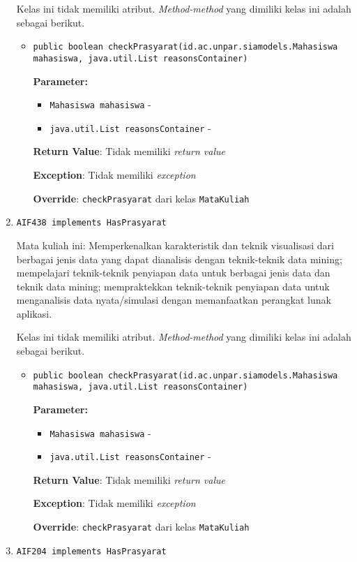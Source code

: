 \documentclass{article}
\begin{document}
\begin{enumerate}
Kelas ini tidak memiliki atribut. \textit{Method-method} yang dimiliki kelas ini adalah sebagai berikut.
\begin{itemize}
\item \texttt{public boolean checkPrasyarat(id.ac.unpar.siamodels.Mahasiswa mahasiswa, java.util.List reasonsContainer)}

\textbf{Parameter:}
\begin{itemize}
\item \texttt{Mahasiswa mahasiswa} - 
\item \texttt{java.util.List reasonsContainer} - 
\end{itemize}
\textbf{Return Value}: Tidak memiliki \textit{return value}

\textbf{Exception}: Tidak memiliki \textit{exception}

\textbf{Override}: \texttt{checkPrasyarat} dari kelas \texttt{MataKuliah}

\end{itemize}
\item \texttt{AIF438 implements HasPrasyarat}

Mata kuliah ini: Memperkenalkan karakteristik dan teknik visualisasi dari
 berbagai jenis data yang dapat dianalisis dengan teknik-teknik data mining;
 mempelajari teknik-teknik penyiapan data untuk berbagai jenis data dan teknik
 data mining; mempraktekkan teknik-teknik penyiapan data untuk menganalisis
 data nyata/simulasi dengan memanfaatkan perangkat lunak aplikasi.

Kelas ini tidak memiliki atribut. \textit{Method-method} yang dimiliki kelas ini adalah sebagai berikut.
\begin{itemize}
\item \texttt{public boolean checkPrasyarat(id.ac.unpar.siamodels.Mahasiswa mahasiswa, java.util.List reasonsContainer)}

\textbf{Parameter:}
\begin{itemize}
\item \texttt{Mahasiswa mahasiswa} - 
\item \texttt{java.util.List reasonsContainer} - 
\end{itemize}
\textbf{Return Value}: Tidak memiliki \textit{return value}

\textbf{Exception}: Tidak memiliki \textit{exception}

\textbf{Override}: \texttt{checkPrasyarat} dari kelas \texttt{MataKuliah}

\end{itemize}
\item \texttt{AIF204 implements HasPrasyarat}


\end{enumerate}
\end{document}

